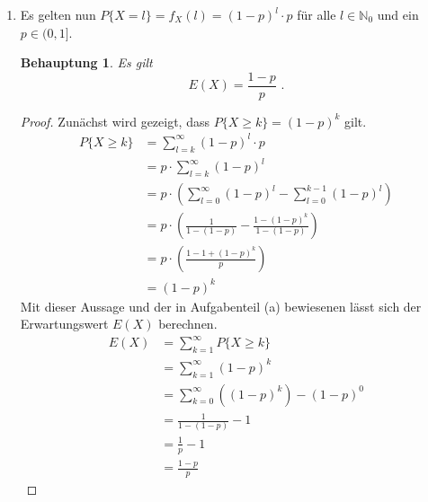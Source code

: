 \documentclass[a4paper]{scrartcl}
\newtheorem*{behaupt}{Behauptung}
\begin{document}
\begin{enumerate}[label=\bfseries\arabic*.]
\begin{enumerate}[label=(\alph*)]
            \item
                Es gelten nun $P\{X = l\} = f_X(l) = (1 - p)^l \cdot p$ für alle
                $l \in \mathbb{N}_0$ und ein $p \in (0, 1]$.
                \begin{behaupt}
                    Es gilt
                    \begin{equation*}
                        E(X) = \frac{1 - p}{p}
                        \text{ .}
                    \end{equation*}
                \end{behaupt}
                \begin{proof}
                    Zunächst wird gezeigt, dass $P\{X \geq k\} = (1 - p)^k$
                    gilt.
                    \begin{equation*}
                        \begin{split}
                            P\{X \geq k\}
                            &= \sum_{l=k}^\infty (1 - p)^l \cdot p \\
                            &= p \cdot \sum_{l=k}^\infty (1 - p)^l \\
                            &= p \cdot \left( \sum_{l=0}^\infty (1 - p)^l
                                - \sum_{l=0}^{k-1} (1 - p)^l \right) \\
                            &= p \cdot \left( \frac{1}{1 - (1 -p)}
                                - \frac{1 - (1 - p)^k}{1 - (1 - p)} \right) \\
                            &= p \cdot \left( \frac{1 - 1 + (1 - p)^k}
                                {p} \right) \\
                            &= (1 - p)^k
                        \end{split}
                    \end{equation*}
                    Mit dieser Aussage und der in Aufgabenteil (a) bewiesenen
                    lässt sich der Erwartungswert $E(X)$ berechnen.
                    \begin{equation*}
                        \begin{split}
                            E(X)
                            &= \sum_{k=1}^\infty P\{X \geq k\} \\
                            &= \sum_{k=1}^\infty (1 - p)^k \\
                            &= \sum_{k=0}^\infty \left( (1 - p)^k \right)
                                - (1 - p)^0 \\
                            &= \frac{1}{1 - (1 - p)} - 1 \\
                            &= \frac{1}{p} - 1 \\
                            &= \frac{1 - p}{p}
                        \end{split}
                    \end{equation*}
                \end{proof}

        \end{enumerate}
\end{enumerate}
\end{document}
